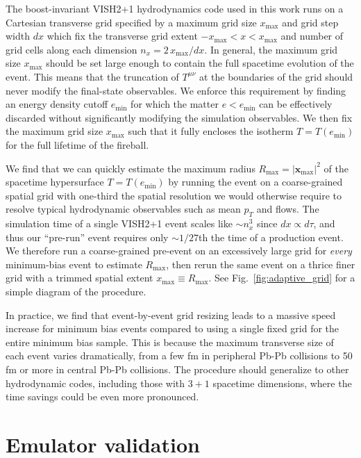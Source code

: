 \documentclass[aps,prc,reprint,amsmath,nofootinbib]{revtex4-1}
\newcommand{\x}{\mathbf x}
\begin{document}
The boost-invariant VISH2+1 hydrodynamics code used in this work \cite{Song:2007ux, Shen:2014vra} runs on a Cartesian transverse grid specified by a maximum grid size $x_\text{max}$ and grid step width $dx$ which fix the transverse grid extent ${-x_\text{max} < x < x_\text{max}}$ and number of grid cells along each dimension ${n_x = 2\, x_\text{max} / dx}$.
In general, the maximum grid size $x_\text{max}$ should be set large enough to contain the full spacetime evolution of the event.
This means that the truncation of $T^{\mu\nu}$ at the boundaries of the grid should never modify the final-state observables.
We enforce this requirement by finding an energy density cutoff $e_\text{min}$ for which the matter $e < e_\text{min}$ can be effectively discarded without significantly modifying the simulation observables.
We then fix the maximum grid size $x_\text{max}$ such that it fully encloses the isotherm $T=T(e_\text{min})$ for the full lifetime of the fireball.

We find that we can quickly estimate the maximum radius $R_\text{max} = |\x_\text{max}|^2$ of the spacetime hypersurface ${T = T(e_\text{min})}$ by running the event on a coarse-grained spatial grid with one-third the spatial resolution we would otherwise require to resolve typical hydrodynamic observables such as mean $p_T$ and flows.
The simulation time of a single VISH2+1 event scales like ${\sim}n_x^3$ since $dx \propto d\tau$, and thus our ``pre-run'' event requires only ${\sim}1/27$th the time of a production event.
We therefore run a coarse-grained pre-event on an excessively large grid for \emph{every} minimum-bias event to estimate $R_\text{max}$, then rerun the same event on a thrice finer grid with a trimmed spatial extent $x_\text{max} \equiv R_\text{max}$.
See Fig.~\ref{fig:adaptive_grid} for a simple diagram of the procedure.

In practice, we find that event-by-event grid resizing leads to a massive speed increase for minimum bias events compared to using a single fixed grid for the entire minimum bias sample.
This is because the maximum transverse size of each event varies dramatically, from a few fm in peripheral Pb-Pb collisions to 50 fm or more in central Pb-Pb collisions.
The procedure should generalize to other hydrodynamic codes, including those with $3+1$ spacetime dimensions, where the time savings could be even more pronounced.


\section{Emulator validation}
\label{app:validation}
\end{document}
